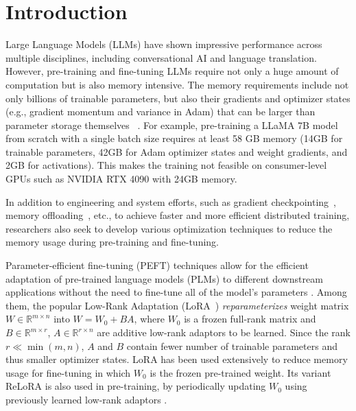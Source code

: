 
\vspace{-8mm}
\section{Introduction}
Large Language Models (LLMs) have shown impressive performance across multiple disciplines, including conversational AI and language translation.
However, pre-training and fine-tuning LLMs require not only a huge amount of computation but is also memory intensive. The memory requirements include not only billions of trainable parameters,  but also their gradients and optimizer states (e.g., gradient momentum and variance in Adam) that can be larger than parameter storage themselves  ~\citep{raffelExploringLimitsTransfer2020,touvronLlamaOpenFoundation2023,chowdheryPaLMScalingLanguage2022}. For example, pre-training a LLaMA 7B model from scratch with a single batch size requires at least 58 GB memory (14GB for trainable parameters, 42GB for Adam optimizer states and weight gradients, and 2GB for activations\protect\footnotemark[1]).
This makes the training not feasible on consumer-level GPUs such as NVIDIA RTX 4090 with 24GB memory.



In addition to engineering and system efforts, such as gradient checkpointing~\cite{chenTrainingDeepNets2016}, memory offloading~\cite{rajbhandariZeROMemoryOptimizations2020}, etc., to achieve faster and more efficient distributed training, researchers also seek to develop various optimization techniques to reduce the memory usage during pre-training and fine-tuning. 

\def\rr{\mathbb{R}}

Parameter-efficient fine-tuning (PEFT) techniques allow for the efficient adaptation of pre-trained language models (PLMs) to different downstream applications without the need to fine-tune all of the model's parameters \citep{dingDeltaTuningComprehensive2022}.
Among them, the popular Low-Rank Adaptation (LoRA~\citet{huLoRALowRankAdaptation2021}) \emph{reparameterizes} weight matrix $W\in \rr^{m\times n}$ into $W = W_0 + BA$, where $W_0$ is a frozen full-rank matrix and $B\in\rr^{m\times r}$, $A\in\rr^{r\times n}$ are additive low-rank adaptors to be learned. Since the rank $r \ll \min(m,n)$, $A$ and $B$ contain fewer number of trainable parameters and thus smaller optimizer states. LoRA has been used extensively to reduce memory usage for fine-tuning in which $W_0$ is the frozen pre-trained weight. Its variant ReLoRA is also used in pre-training, by periodically updating $W_0$ using previously learned low-rank adaptors \citep{lialinReLoRAHighRankTraining2023}.

